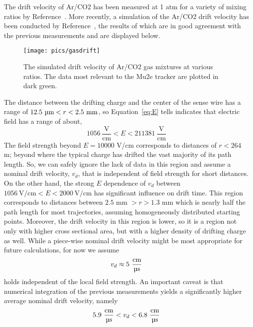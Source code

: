 \documentclass[twoside]{article}
\begin{document}
\begin{multicols}{2}
The drift velocity of Ar/CO2 has been measured at 1 atm for a variety of mixing ratios by Reference~\cite{zhao}. More recently, a simulation of the Ar/CO2 drift velocity has been conducted by Reference~\cite{assran}, the results of which are in good agreement with the previous measurements and are displayed  below. %
\begin{figure}[H]
\label{fig:gas}
    \texttt{[image: pics/gasdrift]}
    \caption{The simulated drift velocity of Ar/CO2 gas mixtures at various ratios. The data most relevant to the Mu2e tracker are plotted in dark green.}
\end{figure}
The distance between the drifting charge and the center of the sense wire has a range of $ 12.5~ \text{\textmu m} < r < 2.5~ \text{mm}$, so Equation~\ref{eq:E} tells indicates that electric field has a range of about,
\begin{equation}
 1056~\frac{\text{V}}{\text{cm}}  < E <  211381~\frac{\text{V}}{\text{cm}} 
\end{equation}
The field strength beyond $E = 10000$ V/cm corresponds to distances of $r < 264$  \textmu m; beyond where the typical charge has drifted the vast majority of its path length. So, we can safely ignore the lack of data in this region and assume a nominal drift velocity, $v_d$, that is independent of field strength for short distances.  On the other hand, the strong $E$ dependence of $v_d$ between $1056~\text{V/cm} < E < 2000~\text{V/cm} $ has significant influence on drift time. This region corresponds to distances between $2.5$ mm $ > r > 1.3 $ mm which is nearly half the path length for most trajectories, assuming homogeneously distributed starting points. Moreover, the drift velocity in this region is lower, so it is a region not only with higher cross sectional area, but with a higher density of drifting charge as well.  While a piece-wise nominal drift velocity might be most appropriate for future calculations, for now we assume
\begin{equation}
v_d \approx 5  \text{ } \frac{\text{cm}}{\text{\textmu s}}
\end{equation}
holds independent of the local field strength. An important caveat is that numerical integration of the previous measurements yields a significantly higher average nominal drift velocity, namely  
\begin{equation}
 5.9 \text{ } \frac{\text{cm}} {\text{\textmu s}} < v_d < 6.8  \text{ } \frac{\text{cm}} {\text{\textmu s}}
 \end{equation}

\end{multicols}
\end{document}
